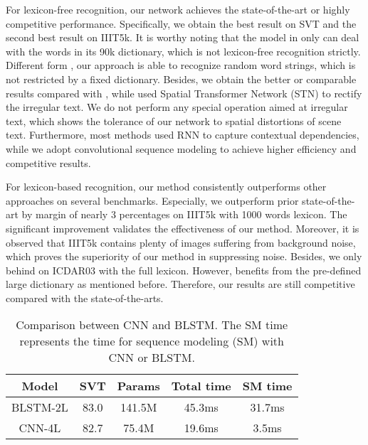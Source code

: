 \documentclass[letterpaper]{article} %
\begin{document}
For lexicon-free recognition, our network achieves the state-of-the-art or highly competitive performance. Specifically, we obtain the best result on SVT and the second best result on IIIT5k. It is worthy noting that the model in \cite{jaderberg2016reading} only can deal with the words in its 90k dictionary, which is not lexicon-free recognition strictly. Different form \cite{jaderberg2016reading}, our approach is able to recognize random word strings, which is not restricted by a fixed dictionary. Besides, we obtain the better or comparable results compared with \cite{shi2016robust}, while \cite{shi2016robust} used Spatial Transformer Network (STN) to rectify the irregular text. We do not perform any special operation aimed at irregular text, which shows the tolerance of our network to spatial distortions of scene text. Furthermore, most methods used RNN to capture contextual dependencies, while we adopt convolutional sequence modeling to achieve higher efficiency and competitive results. \par

For lexicon-based recognition, our method consistently outperforms other approaches on several benchmarks. Especially, we outperform prior state-of-the-art \cite{shi2016end} by margin of nearly 3 percentages on IIIT5k with 1000 words lexicon. The significant improvement validates the effectiveness of our method. Moreover, it is observed that IIIT5k contains plenty of images suffering from background noise, which proves the superiority of our method in suppressing noise. Besides, we only behind \cite{jaderberg2016reading} on ICDAR03 with the full lexicon. However, \cite{jaderberg2016reading} benefits from the pre-defined large dictionary as mentioned before. Therefore, our results are still competitive compared with the state-of-the-arts.

\begin{table}
  \centering
  \caption{Comparison between CNN and BLSTM. The SM time represents the time for sequence modeling (SM) with CNN or BLSTM.}

\begin{tabular}{c|c|c|c|c}
  \hline
  Model & SVT & Params & Total time & SM time \\
  \hline
  BLSTM-2L & 83.0 & 141.5M & 45.3ms & 31.7ms\\
  CNN-4L & 82.7 & 75.4M & 19.6ms & 3.5ms\\
  \hline
\end{tabular}
\label{tab:003}
\end{table}
\end{document}
